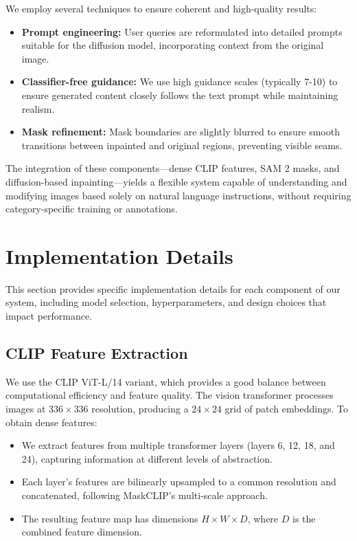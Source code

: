 We employ several techniques to ensure coherent and high-quality results:
\begin{itemize}
    \item \textbf{Prompt engineering:} User queries are reformulated into detailed prompts suitable for the diffusion model, incorporating context from the original image.
    \item \textbf{Classifier-free guidance:} We use high guidance scales (typically 7-10) to ensure generated content closely follows the text prompt while maintaining realism.
    \item \textbf{Mask refinement:} Mask boundaries are slightly blurred to ensure smooth transitions between inpainted and original regions, preventing visible seams.
\end{itemize}

The integration of these components—dense CLIP features, SAM 2 masks, and diffusion-based inpainting—yields a flexible system capable of understanding and modifying images based solely on natural language instructions, without requiring category-specific training or annotations.

\section{Implementation Details}
This section provides specific implementation details for each component of our system, including model selection, hyperparameters, and design choices that impact performance.

\subsection{CLIP Feature Extraction}

We use the CLIP ViT-L/14 variant, which provides a good balance between computational efficiency and feature quality. The vision transformer processes images at $336 \times 336$ resolution, producing a $24 \times 24$ grid of patch embeddings. To obtain dense features:

\begin{itemize}
    \item We extract features from multiple transformer layers (layers 6, 12, 18, and 24), capturing information at different levels of abstraction.
    \item Each layer's features are bilinearly upsampled to a common resolution and concatenated, following MaskCLIP's multi-scale approach.
    \item The resulting feature map has dimensions $H \times W \times D$, where $D$ is the combined feature dimension.
\end{itemize}

